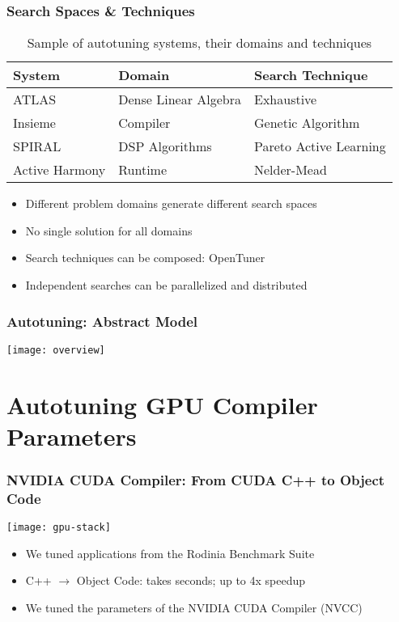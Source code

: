 \documentclass[10pt, compress, aspectratio=169]{beamer}
\begin{document}
\begin{frame}
    \frametitle{Search Spaces \& Techniques}
    \begin{table}[]
        \centering
        \begin{tabular}{@{}lll@{}}
            \toprule
            System & Domain & Search Technique \\ \midrule
            ATLAS & Dense Linear Algebra & Exhaustive \\
            Insieme & Compiler & Genetic Algorithm \\
            SPIRAL & DSP Algorithms & Pareto Active Learning \\
            Active Harmony & Runtime & Nelder-Mead \\ \bottomrule
        \end{tabular}
        \caption{Sample of autotuning systems, their domains and techniques}
    \end{table}

    \begin{itemize}
        \item Different \alert{problem domains} generate different \alert{search spaces}
        \item \alert{No single solution} for all domains
        \item Search techniques can be composed: \alert{OpenTuner}
        \item Independent searches can be \alert{parallelized and distributed}
    \end{itemize}
\end{frame}

\begin{frame}
    \frametitle{Autotuning: Abstract Model}
    \begin{center}
        \texttt{[image: overview]}
    \end{center}
\end{frame}

\section{Autotuning GPU Compiler Parameters}

\begin{frame}
    \frametitle{NVIDIA CUDA Compiler: From CUDA C++ to Object Code}
    \begin{center}
        \texttt{[image: gpu-stack]}
    \end{center}

    \begin{itemize}
        \item We tuned applications from the \alert{Rodinia Benchmark Suite}
        \item C++ $\rightarrow$ Object Code: takes \alert{seconds}; \alert{up to 4x speedup}
        \item We \alert{tuned the parameters} of the NVIDIA CUDA Compiler (NVCC)
    \end{itemize}
\end{frame}
\end{document}
